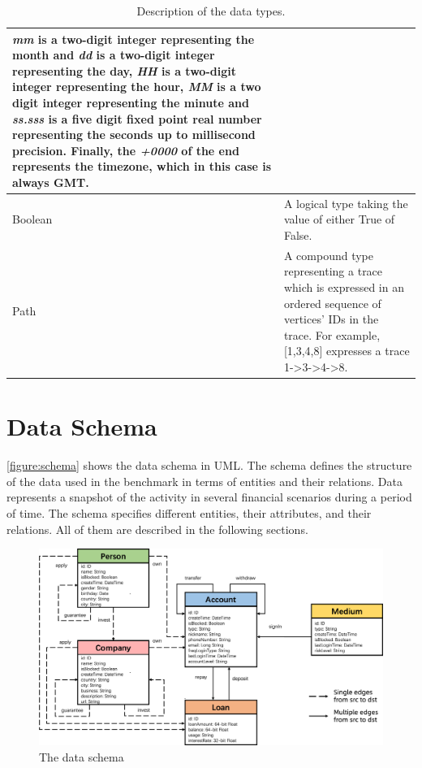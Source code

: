 \begin{table}[h]
\begin{tabular}{|>{\typeCell}p{\attributeColumnWidth}|p{\largeDescriptionColumnWidth}|}
        \textit{mm} is a two-digit integer representing the month and \textit{dd} is
        a two-digit integer representing the day, \textit{HH} is a two-digit integer
        representing the hour, \textit{MM} is a two digit integer representing the
        minute and \textit{ss.sss} is a five digit fixed point real number
        representing the seconds up to millisecond precision. Finally, the
        \textit{+0000} of the end represents the timezone, which in this case is
        always GMT.                                                                                                     \\
        \hline
        Boolean                 & A logical type taking the value of either True of False.                              \\
        \hline
        Path                    & A compound type representing a trace which is expressed in an ordered
        sequence of vertices' IDs in the trace. For example, [1,3,4,8] expresses a
        trace 1->3->4->8.                                                                                               \\
        \hline
    \end{tabular}
    \caption{Description of the data types.}
    \label{table:types}
\end{table}

\section{Data Schema}

\autoref{figure:schema} shows the data schema in UML. The schema defines the
structure of the data used in the benchmark in terms of entities and their
relations. Data represents a snapshot of the activity in several financial
scenarios during a period of time. The schema specifies different entities,
their attributes, and their relations. All of them are described in the
following sections.

\begin{figure}[htbp]
    \centering
    \includegraphics[width=\linewidth]{figures/data-schema}
    \caption{The \ldbcfinbench data schema}
    \label{figure:schema}
\end{figure}

